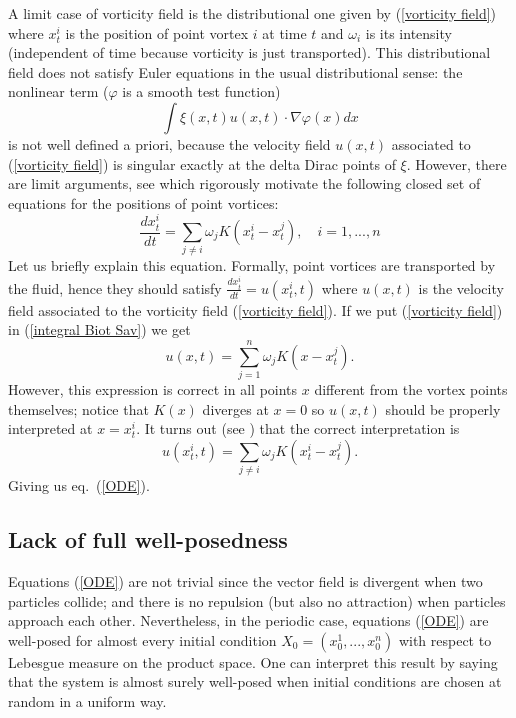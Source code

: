 \documentclass[11pt,a4paper]{article}%
\begin{document}
A limit case of vorticity field is the distributional one given by
(\ref{vorticity field}) where $x_{t}^{i}$ is the position of point vortex $i$
at time $t$ and $\omega_{i}$ is its intensity (independent of time because
vorticity is just transported). This distributional field does not satisfy
Euler equations in the usual distributional sense: the nonlinear term
($\varphi$ is a smooth test function)%
\[
\int\xi(x,t)u(x,t)\cdot\nabla\varphi(x)dx
\]
is not well defined a priori, because the velocity field $u(x,t)$ associated
to (\ref{vorticity field}) is singular exactly at the delta Dirac points of
$\xi$. However, there are limit arguments, see \cite{March Pulv} which
rigorously motivate the following closed set of equations for the positions of
point vortices:
\begin{equation}
\frac{dx_{t}^{i}}{dt}=\sum_{j\neq i}\omega_{j}K(x_{t}^{i}-x_{t}^{j}),\quad
i=1,...,n\label{ODE}%
\end{equation}
Let us briefly explain this equation. Formally, point vortices are transported
by the fluid, hence they should satisfy $\frac{dx_{t}^{i}}{dt}=u(x_{t}^{i},t)$
where $u(x,t)$ is the velocity field associated to the vorticity field
(\ref{vorticity field}). If we put (\ref{vorticity field}) in
(\ref{integral Biot Sav}) we get
\[
u(x,t)=\sum_{j=1}^{n}\omega_{j}K(x-x_{t}^{j}).
\]
However, this expression is correct in all points $x$ different from the
vortex points themselves; notice that $K(x)$ diverges at $x=0$ so $u(x,t)$
should be properly interpreted at $x=x_{t}^{i}$. It turns out (see \cite{March
Pulv}) that the correct interpretation is
\begin{equation}
u(x_{t}^{i},t)=\sum_{j\neq i}\omega_{j}K(x_{t}^{i}-x_{t}^{j}%
).\label{velocity of point vortices}%
\end{equation}
Giving us eq.~(\ref{ODE}).

\subsection{Lack of full well-posedness}

Equations (\ref{ODE}) are not trivial since the vector field is
divergent when two particles collide; and there is no repulsion (but
also no attraction) when particles approach each other.
Nevertheless, in the periodic case, equations (\ref{ODE}) are
well-posed for almost every initial condition $X_{0}=(
x_{0}^{1},...,x_{0}^{n}) $ with respect to Lebesgue measure on the
product space. One can interpret this result by saying that the
system is almost surely well-posed when initial conditions are
chosen at random in a uniform way.
\end{document}
